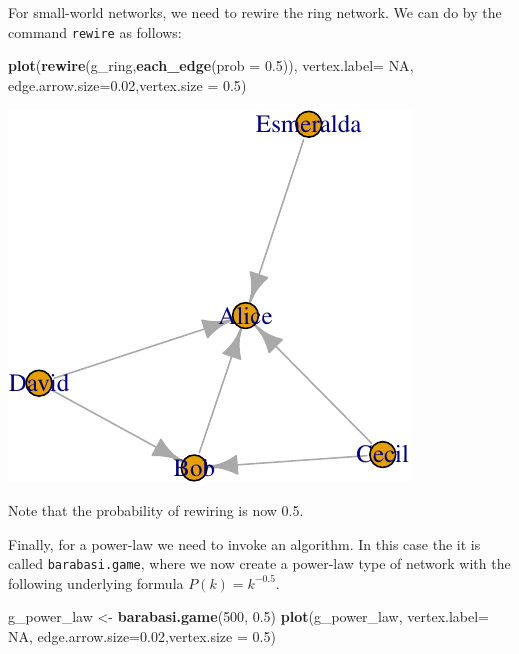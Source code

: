 \documentclass[]{article}
\newenvironment{Shaded}{\begin{snugshade}}{\end{snugshade}}
\newcommand{\KeywordTok}[1]{\textcolor[rgb]{0.13,0.29,0.53}{\textbf{{#1}}}}
\newcommand{\DataTypeTok}[1]{\textcolor[rgb]{0.13,0.29,0.53}{{#1}}}
\newcommand{\DecValTok}[1]{\textcolor[rgb]{0.00,0.00,0.81}{{#1}}}
\newcommand{\FloatTok}[1]{\textcolor[rgb]{0.00,0.00,0.81}{{#1}}}
\newcommand{\StringTok}[1]{\textcolor[rgb]{0.31,0.60,0.02}{{#1}}}
\newcommand{\OtherTok}[1]{\textcolor[rgb]{0.56,0.35,0.01}{{#1}}}
\newcommand{\NormalTok}[1]{{#1}}
\theoremstyle{definition}
\theoremstyle{definition}
\theoremstyle{definition}
\theoremstyle{remark}
\begin{document}
For small-world networks, we need to rewire the ring network. We can do
by the command \texttt{rewire} as follows:

\begin{Shaded}
\begin{Highlighting}[]
\KeywordTok{plot}\NormalTok{(}\KeywordTok{rewire}\NormalTok{(g_ring,}\KeywordTok{each_edge}\NormalTok{(}\DataTypeTok{prob =} \FloatTok{0.5}\NormalTok{)), }\DataTypeTok{vertex.label=} \OtherTok{NA}\NormalTok{, }\DataTypeTok{edge.arrow.size=}\FloatTok{0.02}\NormalTok{,}\DataTypeTok{vertex.size =} \FloatTok{0.5}\NormalTok{)}
\end{Highlighting}
\end{Shaded}

\includegraphics{ResearchTools_files/figure-latex/unnamed-chunk-57-1.pdf}

Note that the probability of rewiring is now 0.5.

Finally, for a power-law we need to invoke an algorithm. In this case
the it is called \texttt{barabasi.game}, where we now create a power-law
type of network with the following underlying formula
\(P(k) = k^{-0.5}\).

\begin{Shaded}
\begin{Highlighting}[]
\NormalTok{g_power_law <-}\StringTok{ }\KeywordTok{barabasi.game}\NormalTok{(}\DecValTok{500}\NormalTok{, }\FloatTok{0.5}\NormalTok{)}
\KeywordTok{plot}\NormalTok{(g_power_law, }\DataTypeTok{vertex.label=} \OtherTok{NA}\NormalTok{, }\DataTypeTok{edge.arrow.size=}\FloatTok{0.02}\NormalTok{,}\DataTypeTok{vertex.size =} \FloatTok{0.5}\NormalTok{)}
\end{Highlighting}
\end{Shaded}
\end{document}

